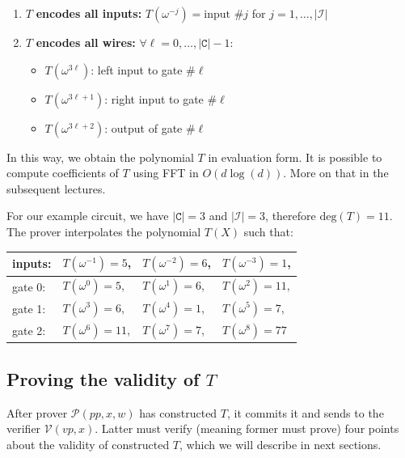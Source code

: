 \documentclass[../lecture-notes.tex]{subfiles}
\begin{document}
\begin{enumerate}
    \item \(T\) \textbf{encodes all inputs:} \( T(\omega^{-j}) = \text{input \#} j\) for \(j = 1, \dots, |\mathcal{I}| \)
    \item \(T\) \textbf{encodes all wires:} \( \forall \ell = 0, \dots, |\texttt{C}| - 1: \)
    \begin{itemize}
        \item \( T(\omega^{3\ell}) \): left input to gate \#\( \ell \)
        \item \( T(\omega^{3\ell+1}) \): right input to gate \#\( \ell \)
        \item \( T(\omega^{3\ell+2}) \): output of gate \#\( \ell \)
    \end{itemize}
\end{enumerate}

\begin{remark}
In this way, we obtain the polynomial \(T\) in evaluation form. It is possible to compute coefficients of \(T\) using FFT in \(O(d\log(d))\). More on that in the subsequent lectures.
\end{remark}

\begin{example}
For our example circuit, we have \(|\texttt{C}| = 3\) and \(|\mathcal{I}| = 3\), therefore \(\text{deg}(T) = 11\). The prover interpolates the polynomial \(T(X)\) such that:
\begin{center}
\begin{tabular}{l l l l}
  inputs: & $T(\omega^{-1}) = 5$, & $T(\omega^{-2}) = 6$, & $T(\omega^{-3}) = 1$, \\ \hline
  gate 0: & $T(\omega^{0}) = 5$, & $T(\omega^{1}) = 6$, & $T(\omega^{2}) = 11$, \\
  gate 1: & $T(\omega^{3}) = 6$, & $T(\omega^{4}) = 1$, & $T(\omega^{5}) = 7$, \\
  gate 2: & $T(\omega^{6}) = 11$, & $T(\omega^{7}) = 7$, & $T(\omega^{8}) = 77$ \\ 
\end{tabular}
\end{center}
\end{example}

\subsection{Proving the validity of \texorpdfstring{\(T\)}{T}}

After prover \(\mathcal{P}(pp, x, w)\) has constructed \(T\), it commits it and sends to the verifier \(\mathcal{V}(vp, x)\). Latter must verify (meaning former must prove) four points about the validity of constructed \(T\), which we will describe in next sections.
\end{document}
